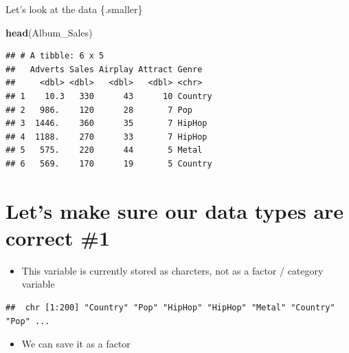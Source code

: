 \documentclass[
]{book}
\newenvironment{Shaded}{\begin{snugshade}}{\end{snugshade}}
\newcommand{\KeywordTok}[1]{\textcolor[rgb]{0.13,0.29,0.53}{\textbf{#1}}}
\newcommand{\NormalTok}[1]{#1}
\newcommand{\OperatorTok}[1]{\textcolor[rgb]{0.81,0.36,0.00}{\textbf{#1}}}
\newcommand{\StringTok}[1]{\textcolor[rgb]{0.31,0.60,0.02}{#1}}
\providecommand{\tightlist}{%
  \setlength{\itemsep}{0pt}\setlength{\parskip}{0pt}}
\begin{document}
Let's look at the data \{.smaller\}

\begin{Shaded}
\begin{Highlighting}[]
\KeywordTok{head}\NormalTok{(Album_Sales)}
\end{Highlighting}
\end{Shaded}

\begin{verbatim}
## # A tibble: 6 x 5
##   Adverts Sales Airplay Attract Genre  
##     <dbl> <dbl>   <dbl>   <dbl> <chr>  
## 1    10.3   330      43      10 Country
## 2   986.    120      28       7 Pop    
## 3  1446.    360      35       7 HipHop 
## 4  1188.    270      33       7 HipHop 
## 5   575.    220      44       5 Metal  
## 6   569.    170      19       5 Country
\end{verbatim}

\hypertarget{lets-make-sure-our-data-types-are-correct-1}{%
\section{Let's make sure our data types are correct \#1}\label{lets-make-sure-our-data-types-are-correct-1}}

\begin{itemize}
\tightlist
\item
  This variable is currently stored as charcters, not as a factor / category variable
\end{itemize}

\begin{Shaded}
\end{Shaded}

\begin{verbatim}
##  chr [1:200] "Country" "Pop" "HipHop" "HipHop" "Metal" "Country" "Pop" ...
\end{verbatim}

\begin{itemize}
\tightlist
\item
  We can save it as a factor
\end{itemize}

\begin{Shaded}
\end{Shaded}
\end{document}
